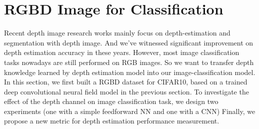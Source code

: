 \documentclass[10pt,twocolumn,letterpaper]{article}
\begin{document}
\section{RGBD Image for Classification}
Recent depth image research works mainly focus on depth-estimation\cite{liu2015deep} 
and segmentation with depth image\cite{eigen2015predicting}.
And we\rq{}ve witnessed significant improvement on depth estimation accuracy in these years. 
However, most image classification tasks nowadays are still performed on RGB images.
So we want to transfer depth knowledge learned by depth estimation model into our image-classification model.
In this section, 
we first built a RGBD dataset for CIFAR10\cite{krizhevsky2009learning}, 
based on a trained deep convolutional neural field model in the previous section. 
To investigate the effect of the depth channel on image classification task, 
we design two experiments (one with a simple feedforward NN and one with a CNN) 
Finally, we propose a new metric for depth estimation performance measurement.
\end{document}
